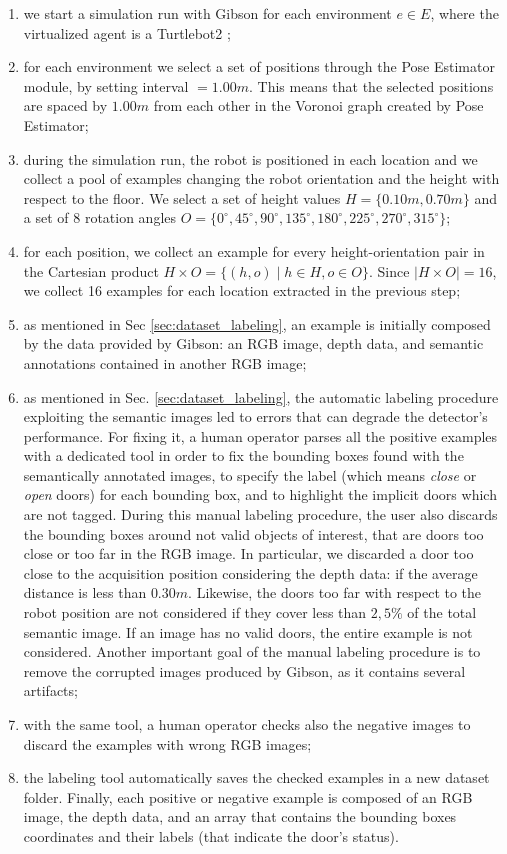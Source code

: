 \begin{enumerate}
	\item we start a simulation run with Gibson for each environment $e \in E$, where the virtualized agent is a Turtlebot2 \cite{turtlebot2};
	\item for each environment we select a set of positions through the Pose Estimator module, by setting \textsf{interval} $= 1.00m$. This means that the selected positions are spaced by $1.00m$ from each other in the Voronoi graph created by Pose Estimator;
	\item during the simulation run, the robot is positioned in each location and we collect a pool of examples changing the robot orientation and the height with respect to the floor. We select a set of height values $H = \{0.10m, 0.70m\}$ and a set of 8 rotation angles $O = \{0^{\circ}, 45^{\circ}, 90^{\circ}, 135^{\circ}, 180^{\circ}, 225^{\circ}, 270^{\circ}, 315^{\circ}\}$;
	\item for each position, we collect an example for every height-orientation pair in the Cartesian product $H \times O = \{(h, o) \mid h \in H, o \in O\}$. Since $|H \times O| = 16$, we collect 16 examples for each location extracted in the previous step;
	\item as mentioned in Sec \ref{sec:dataset_labeling}, an example is initially composed by the data provided by Gibson: an RGB image, depth data, and semantic annotations contained in another RGB image;
	\item as mentioned in Sec. \ref{sec:dataset_labeling}, the automatic labeling procedure exploiting the semantic images led to errors that can degrade  the detector's performance. For fixing it, a human operator parses all the positive examples with a dedicated tool in order to fix the bounding boxes found with the semantically annotated images, to specify the label (which means \textit{close} or \textit{open} doors) for each bounding box, and to highlight the implicit doors which are not tagged. During this manual labeling procedure, the user also discards the bounding boxes around not valid objects of interest, that are doors too close or too far in the RGB image. In particular, we discarded a door too close to the acquisition position considering the depth data: if the average distance is less than $0.30 m$. Likewise, the doors too far with respect to the robot position are not considered if they cover less than $2,5\%$ of the total semantic image. If an image has no valid doors, the entire example is not considered. Another important goal of the manual labeling procedure is to remove the corrupted images produced by Gibson, as it contains several artifacts;
	\item with the same tool, a human operator checks also the negative images to discard the examples with wrong RGB images; 
	\item the labeling tool automatically saves the checked examples in a new dataset folder. Finally, each positive or negative example is composed of an RGB image, the depth data, and an array that contains the bounding boxes coordinates and their labels (that indicate the door's status). 
\end{enumerate}


